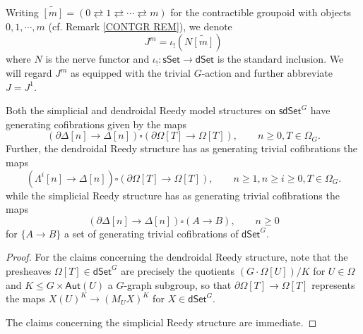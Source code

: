\documentclass[a4paper,10pt
]{article}%
\begin{document}


\begin{notation}\label{JM NOT}
Writing
	$\widetilde{[m]} = 
	(0 \rightleftarrows 
	1 \rightleftarrows \cdots
	\rightleftarrows m)$
for the contractible groupoid with objects 
$0,1,\cdots,m$ (cf. Remark \ref{CONTGR REM}),
we denote
\[
J^m = \iota_{!} \left(N \widetilde{[m]}\right)
\]
where $N$ is the nerve functor and
$\iota_! \colon \mathsf{sSet} \to \mathsf{dSet}$ is the standard inclusion.
We will regard $J^m$ as equipped with the trivial $G$-action and further abbreviate $J = J^1$.
\end{notation}


\begin{proposition}
	Both the simplicial and dendroidal Reedy model structures on 
	$\mathsf{sdSet}^G$ have generating cofibrations given by the maps
\begin{equation}\label{JOINTCOF EQ}
	\left(\partial \Delta [n] \to \Delta[n]\right)
		\square
	\left(\partial \Omega[T] \to \Omega[T]\right),
	\qquad
	n\geq 0, T \in \Omega_G.
\end{equation}
  Further, the dendroidal Reedy structure has as generating trivial cofibrations the maps
\begin{equation}\label{DENDTRIVCOF EQ}
	\left(\Lambda^i [n] \to \Delta[n]\right)
		\square
	\left(\partial \Omega[T] \to \Omega[T]\right),
	\qquad
 	n\geq 1, n\geq i \geq 0, T \in \Omega_G.
\end{equation}
while the simplicial Reedy structure has as generating trivial cofibrations the maps
\begin{equation}\label{SIMPTRIVCOF EQ}
	\left(\partial \Delta [n] \to \Delta[n]\right)
		\square
	\left(A \to B\right),
	\qquad
	n\geq 0
\end{equation}
for $\{A \to B\}$ a set of generating trivial cofibrations of
$\mathsf{dSet}^G$.
\end{proposition}


\begin{proof}
	For the claims concerning the dendroidal Reedy structure, 
	note that the presheaves $\Omega[T] \in \mathsf{dSet}^G$
	are precisely the quotients $(G \cdot \Omega[U])/K$ for $U\in \Omega$ and $K \leq G \times \mathsf{Aut}(U)$ a $G$-graph subgroup,
	so that $\partial \Omega[T] \to \Omega[T]$
	represents the maps $X(U)^K \to (M_U X)^K$ for $X \in \mathsf{dSet}^G$.
	
	The claims concerning the simplicial Reedy structure are immediate.
\end{proof}
\end{document}
